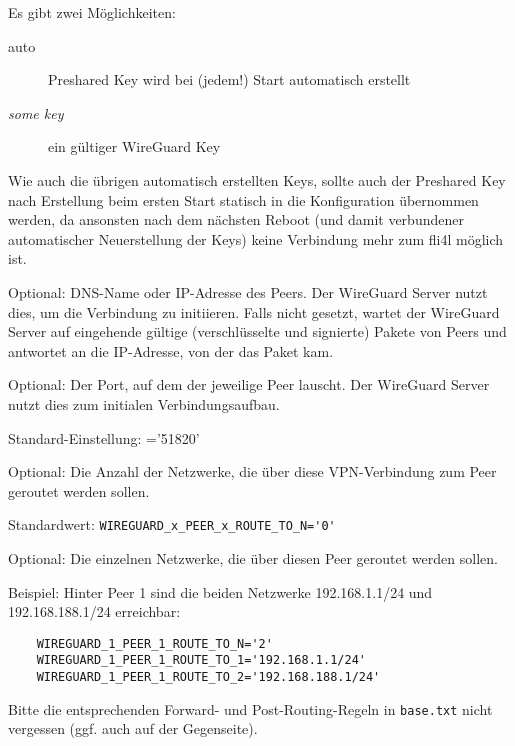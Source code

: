 \begin{description}
Es gibt zwei Möglichkeiten:

\begin{description}
    \item[auto] Preshared Key wird bei (jedem!) Start automatisch erstellt
    \item[\textit{some key}] ein gültiger WireGuard Key
\end{description}

Wie auch die übrigen automatisch erstellten Keys, sollte auch der
Preshared Key nach Erstellung beim ersten Start statisch in die
Konfiguration übernommen werden, da ansonsten nach dem nächsten
Reboot (und damit verbundener automatischer Neuerstellung der Keys)
keine Verbindung mehr zum fli4l möglich ist.



Optional: DNS-Name oder IP-Adresse des Peers. Der WireGuard Server
nutzt dies, um die Verbindung zu initiieren.  Falls nicht gesetzt,
wartet der WireGuard Server auf eingehende gültige (verschlüsselte
und signierte) Pakete von Peers und antwortet an die IP-Adresse, von
der das Paket kam.



Optional: Der Port, auf dem der jeweilige Peer lauscht. Der WireGuard Server nutzt dies zum initialen
Verbindungsaufbau.

Standard-Einstellung: ='51820'



Optional: Die Anzahl der Netzwerke, die über diese VPN-Verbindung
zum Peer geroutet werden sollen.

Standardwert: \verb+WIREGUARD_x_PEER_x_ROUTE_TO_N='0'+



Optional: Die einzelnen Netzwerke, die über diesen Peer geroutet werden sollen.

Beispiel: Hinter Peer 1 sind die beiden Netzwerke 192.168.1.1/24 und 192.168.188.1/24 erreichbar:

\begin{example}
\begin{verbatim}
    WIREGUARD_1_PEER_1_ROUTE_TO_N='2'
    WIREGUARD_1_PEER_1_ROUTE_TO_1='192.168.1.1/24'
    WIREGUARD_1_PEER_1_ROUTE_TO_2='192.168.188.1/24'
\end{verbatim}
\end{example}

Bitte die entsprechenden Forward- und Post-Routing-Regeln in
\texttt{base.txt} nicht vergessen (ggf. auch auf der Gegenseite).

\end{description}

